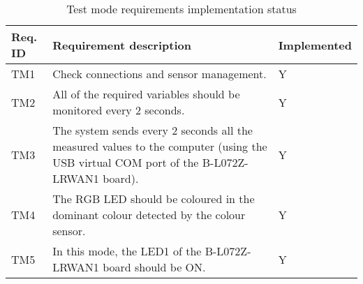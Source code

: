 \vspace{2\baselineskip}

\begin{table}[H]
    \begin{center}
        \begin{tabular}{|p{} | p{} | p{}|}
            \hline
            \textbf{Req. ID} & \textbf{Requirement description} & \textbf{Implemented}\\
            \hline
            TM1 & Check connections and sensor management. & Y\\
            \hline
            TM2 & All of the required variables should be monitored every 2 seconds. & Y\\
            \hline
            TM3 & The system sends every 2 seconds all the measured values to the computer (using the USB virtual COM port of the B-L072Z-LRWAN1 board). & Y\\
            \hline
            TM4 & The RGB LED should be coloured in the dominant colour detected by the colour sensor. & Y\\
            \hline
            TM5 & In this mode, the LED1 of the B-L072Z-LRWAN1 board should be ON. & Y\\
            \hline
        \end{tabular} 
    \end{center}
    \caption{Test mode requirements implementation status}
    \label{ReqTest}
\end{table}

